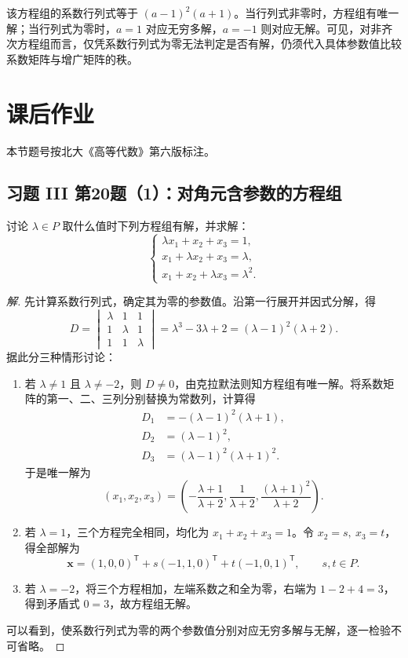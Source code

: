 \documentclass[UTF8, fontset=fandol, a4paper, 12pt]{ctexart}
\newcommand{\vx}{\boldsymbol{x}}
\theoremstyle{definition}
\begin{document}
该方程组的系数行列式等于 $(a-1)^2(a+1)$。当行列式非零时，方程组有唯一解；当行列式为零时，$a=1$ 对应无穷多解，$a=-1$ 则对应无解。可见，对非齐次方程组而言，仅凭系数行列式为零无法判定是否有解，仍须代入具体参数值比较系数矩阵与增广矩阵的秩。

\section{课后作业}

本节题号按北大《高等代数》第六版标注。

\subsection{习题 III 第20题（1）：对角元含参数的方程组}

讨论 $\lambda\in P$ 取什么值时下列方程组有解，并求解：
\[
 \begin{cases}
 \lambda x_1+x_2+x_3=1,\\
 x_1+\lambda x_2+x_3=\lambda,\\
 x_1+x_2+\lambda x_3=\lambda^2.
 \end{cases}
\]
\begin{proof}[解]
先计算系数行列式，确定其为零的参数值。沿第一行展开并因式分解，得
\[
 D=\begin{vmatrix}\lambda&1&1\\1&\lambda&1\\1&1&\lambda\end{vmatrix}
 =\lambda^3-3\lambda+2=(\lambda-1)^2(\lambda+2).
\]
据此分三种情形讨论：
\begin{enumerate}
 \item 若 $\lambda\ne1$ 且 $\lambda\ne-2$，则 $D\ne0$，由克拉默法则知方程组有唯一解。将系数矩阵的第一、二、三列分别替换为常数列，计算得
 \begin{align*}
 D_1&=-(\lambda-1)^2(\lambda+1),\\
 D_2&=(\lambda-1)^2,\\
 D_3&=(\lambda-1)^2(\lambda+1)^2.
 \end{align*}
 于是唯一解为
 \[
  \boxed{(x_1,x_2,x_3)=
  \left(-\frac{\lambda+1}{\lambda+2},\frac1{\lambda+2},
  \frac{(\lambda+1)^2}{\lambda+2}\right).}
 \]
 \item 若 $\lambda=1$，三个方程完全相同，均化为 $x_1+x_2+x_3=1$。令 $x_2=s,\ x_3=t$，得全部解为
 \[
  \vx=(1,0,0)^{\mathsf T}+s(-1,1,0)^{\mathsf T}
  +t(-1,0,1)^{\mathsf T},\qquad s,t\in P.
 \]
 \item 若 $\lambda=-2$，将三个方程相加，左端系数之和全为零，右端为 $1-2+4=3$，得到矛盾式 $0=3$，故方程组无解。
\end{enumerate}
可以看到，使系数行列式为零的两个参数值分别对应无穷多解与无解，逐一检验不可省略。
\end{proof}
\end{document}
